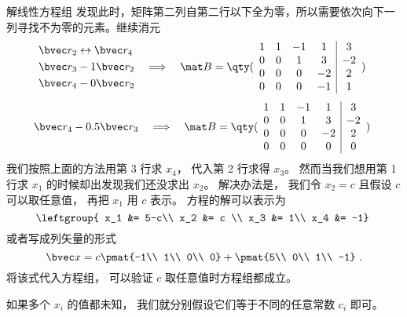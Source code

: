 \begin{example}{解线性方程组}
发现此时，矩阵第二列自第二行以下全为零，所以需要依次向下一列寻找不为零的元素。继续消元
\begin{equation}
\begin{aligned}
&\bvec r_2 \leftrightarrow \bvec r_4 \\
&\bvec r_3 - 1 \bvec r_2 \\
&\bvec r_4 - 0 \bvec r_2 \\
\end{aligned}
\quad \Longrightarrow \quad
\mat B={
	\qty(\begin{array}{cccc|c}
	1 &1 &-1  &1   &3  \\
	0 &0 &1   &3   &-2 \\
	0 &0 &0   &-2  &2  \\
	0 &0 &0   &-1  &1 \\
	\end{array} 
	)}~
\end{equation}
\begin{equation}
\bvec r_4 - 0.5 \bvec r_3
\quad \Longrightarrow \quad
\mat B={
	\qty(\begin{array}{cccc|c}
	1 &1 &-1  &1   &3  \\
	0 &0 &1   &3   &-2 \\
	0 &0 &0   &-2  &2  \\
	0 &0 &0   &0   &0  \\
	\end{array} 
	)}~
\end{equation}
我们按照上面的方法用第 3 行求 $x_4$， 代入第 2 行求得 $x_3$。 然而当我们想用第 1 行求 $x_1$ 的时候却出发现我们还没求出 $x_2$。 解决办法是， 我们令 $x_2 = c$ 且假设 $c$ 可以取任意值， 再把 $x_1$ 用 $c$ 表示。 方程的解可以表示为
\begin{equation}
\leftgroup{
x_1 &= 5-c\\
x_2 &= c \\
x_3 &= 1\\
x_4 &= -1}~
\end{equation}
或者写成列矢量的形式
\begin{equation}
\bvec x = c \pmat{-1\\ 1\\ 0\\ 0} + \pmat{5\\ 0\\ 1\\ -1}~.
\end{equation}
将该式代入方程组， 可以验证 $c$ 取任意值时方程组都成立。

如果多个 $x_i$ 的值都未知， 我们就分别假设它们等于不同的任意常数 $c_i$ 即可。
\end{example}

